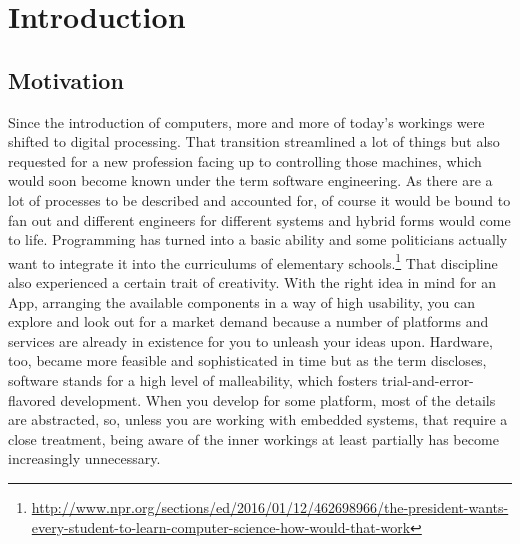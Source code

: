 \newpage{}

\tableofcontents{}

\newpage{}

\setcounter{page}{7}


\renewcommand{\nomname}{List of Abbreviations}
\printnomenclature

\newpage{}

\listoftables

\newpage{}

\listoffigures

\newpage{}


\vspace{17.1mm}

\newpage{}

\chapter{Introduction}

\section{Motivation}
Since the introduction of computers, more and more of today's workings were shifted to digital processing. That transition streamlined a lot of things but also requested for a new profession facing up to controlling those machines, which would soon become known under the term software engineering. As there are a lot of processes to be described and accounted for, of course it would be bound to fan out and different engineers for different systems and hybrid forms would come to life. Programming has turned into a basic ability and some politicians actually want to integrate it into the curriculums of elementary schools.\footnote{\url{http://www.npr.org/sections/ed/2016/01/12/462698966/the-president-wants-every-student-to-learn-computer-science-how-would-that-work}} That discipline also experienced a certain trait of creativity. With the right idea in mind for an App, arranging the available components in a way of high usability, you can explore and look out for a market demand because a number of platforms and services are already in existence for you to unleash your ideas upon. Hardware, too, became more feasible and sophisticated in time but as the term discloses, software stands for a high level of malleability, which fosters trial-and-error-flavored development. When you develop for some platform, most of the details are abstracted, so, unless you are working with embedded systems, that require a close treatment, being aware of the inner workings at least partially has become increasingly unnecessary.

